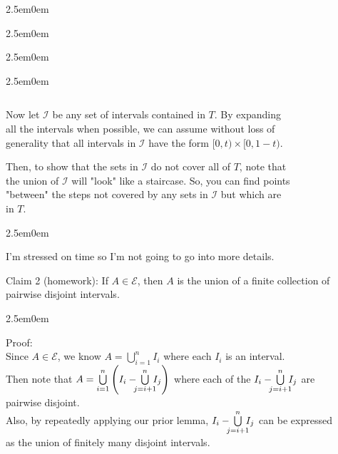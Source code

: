 \documentclass{book}
\newcommand{\exTwo}{%
   \color{RedViolet}%
   \fontsize{13}{15}\selectfont%
}
\newcommand{\exP}{%
   \color{VioletRed}%
   \fontsize{12}{14}\selectfont%
}
\newenvironment{myIndent}{%
   \begin{adjustwidth}{2.5em}{0em}%
}{%
   \end{adjustwidth}%
}
\newcommand{\retTwo}{\hfill\bigbreak}
\begin{document}
{\begin{myIndent}
{\begin{myIndent}
\begin{myIndent}
\begin{myIndent}
\begin{tabular}{p{2in} p{1.6in}}
            \end{tabular}
         \end{myIndent}

         Now let $\mathcal{I}$ be any set of intervals contained in $T$. By expanding\\ all the intervals when possible, we can assume without loss of\\ generality that all intervals in $\mathcal{I}$ have the form $[0, t)\times [0, 1-t)$.\retTwo

         Then, to show that the sets in $\mathcal{I}$ do not cover all of $T$, note that\\ the union of $\mathcal{I}$ will "look" like a staircase. So, you can find points\\ "between" the steps not covered by any sets in $\mathcal{I}$ but which are\\ in $T$.
         
         \begin{myIndent}\exP
            I'm stressed on time so I'm not going to go into more details.\retTwo
         \end{myIndent}
      \end{myIndent}
   \end{myIndent}}

   Claim 2 (homework): If $A \in \mathcal{E}$, then $A$ is the union of a finite collection of\\ pairwise disjoint intervals.
   
   {\begin{myIndent}\exTwo
      Proof:\\ [-4pt]
      Since $A \in \mathcal{E}$, we know $A = \bigcup\limits_{i=1}^n I_i$ where each $I_i$ is an interval.\\ [-4pt]

      Then note that $A = \bigcup\limits_{i=1}^n \left(I_i - \hspace{-0.5em}\bigcup\limits_{j=i+1}^n \hspace{-0.5em}I_j\right)$ where each of the $I_i - \hspace{-0.5em}\bigcup\limits_{j=i+1}^n \hspace{-0.5em}I_j$ are\\ [-12pt] pairwise disjoint.\\ [-4pt]
      
      Also, by repeatedly applying our prior lemma, $I_i - \hspace{-0.5em}\bigcup\limits_{j=i+1}^n \hspace{-0.5em}I_j$ can be expressed\\ [-10pt] as the union of finitely many disjoint intervals.\retTwo
   \end{myIndent}}
\end{myIndent}}
\end{document}
